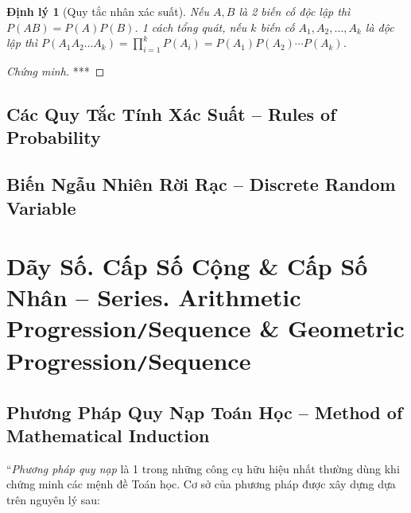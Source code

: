 \documentclass[oneside]{book}
\numberwithin{equation}{section}
\newtheorem{dinhly}{Định lý}[section]
\begin{document}
\begin{dinhly}[Quy tắc nhân xác suất]
	Nếu $A,B$ là 2 biến cố độc lập thì $P(AB) = P(A)P(B)$. 1 cách tổng quát, nếu $k$ biến cố $A_1,A_2,\ldots,A_k$ là độc lập thì $P(A_1A_2\ldots A_k) = \prod_{i=1}^k P(A_i) = P(A_1)P(A_2)\cdots P(A_k)$.
\end{dinhly}

\begin{proof}[Chứng minh]
	***
\end{proof}



\section{Các Quy Tắc Tính Xác Suất -- Rules of Probability}


\section{Biến Ngẫu Nhiên Rời Rạc -- Discrete Random Variable}


\chapter{Dãy Số. Cấp Số Cộng \& Cấp Số Nhân -- Series. Arithmetic Progression\texttt{/}Sequence \& Geometric Progression\texttt{/}Sequence}

\section{Phương Pháp Quy Nạp Toán Học -- Method of Mathematical Induction}
``\textit{Phương pháp quy nạp} là 1 trong những công cụ hữu hiệu nhất thường dùng khi chứng minh các mệnh đề Toán học. Cơ sở của phương pháp được xây dựng dựa trên nguyên lý sau:
\end{document}
